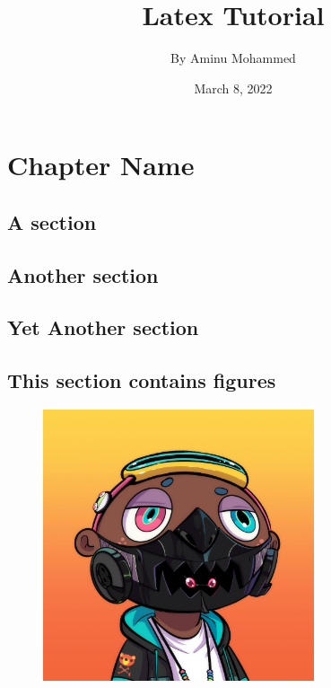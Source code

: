 \documentclass[a4paper,12pt]{book}
\begin{document}
    \title{\Large{\textbf{Latex Tutorial}}}
    \author{By Aminu Mohammed}
    \date{March 8, 2022}
    \maketitle
    \fancyhf{}
    \renewcommand{\headrulewidth}{2pt}
    \renewcommand{\footrulewidth}{1pt}
    \fancyhead[LE]{\leftmark}
    \fancyhead[RO]{\nouppercase{\rightmark}}
    \fancyfoot[LE,RO]{\thepage}
    \tableofcontents
    \chapter{Chapter Name}
    \blindmathtrue
    \blindtext[5]
    \section{A section}
    \blindtext[2]
    \section{Another section}
    \enlargethispage{\baselineskip}
    \blindtext[3]
    \blinditemize
    \blindenumerate
    \blinddescription
    \newpage
    \section{Yet Another section}
    \blindtext[1]
    \section{This section contains figures}
    \blindtext[1]
    \begin{figure}[ht]
        \centering
        \includegraphics[width=8cm]{image.jpeg}
    \end{figure}
    \blindtext[2]
\end{document}
